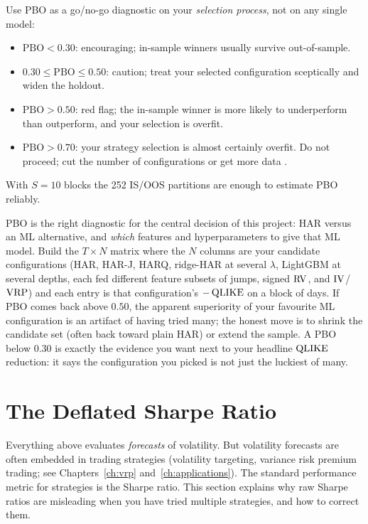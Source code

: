 \begin{keyidea}
Use PBO as a go/no-go diagnostic on your \emph{selection process}, not on any single model:
\begin{itemize}[nosep]
  \item $\text{PBO} < 0.30$: encouraging; in-sample winners usually survive out-of-sample.
  \item $0.30 \le \text{PBO} \le 0.50$: caution; treat your selected configuration sceptically and widen the holdout.
  \item $\text{PBO} > 0.50$: red flag; the in-sample winner is more likely to underperform than outperform, and your selection is overfit.
  \item $\text{PBO} > 0.70$: your strategy selection is almost certainly overfit. Do not proceed; cut the number of configurations or get more data \citep{Bailey2014PBO}.
\end{itemize}
With $S = 10$ blocks the 252 IS/OOS partitions are enough to estimate PBO reliably.
\end{keyidea}

\begin{projectconnection}
PBO is the right diagnostic for the central decision of this project: HAR versus an ML alternative, and \emph{which} features and hyperparameters to give that ML model.
Build the $T \times N$ matrix where the $N$ columns are your candidate configurations (HAR, HAR-J, HARQ, ridge-HAR at several $\lambda$, LightGBM at several depths, each fed different feature subsets of jumps, signed $\operatorname{RV}$, and $\operatorname{IV}$/$\operatorname{VRP}$) and each entry is that configuration's $-\operatorname{QLIKE}$ on a block of days.
If PBO comes back above $0.50$, the apparent superiority of your favourite ML configuration is an artifact of having tried many; the honest move is to shrink the candidate set (often back toward plain HAR) or extend the sample.
A PBO below $0.30$ is exactly the evidence you want next to your headline $\operatorname{QLIKE}$ reduction: it says the configuration you picked is not just the luckiest of many.
\end{projectconnection}

\section{The Deflated Sharpe Ratio}
\label{sec:eval-dsr}

Everything above evaluates \emph{forecasts} of volatility.
But volatility forecasts are often embedded in trading strategies (volatility targeting, variance risk premium trading; see Chapters~\ref{ch:vrp} and~\ref{ch:applications}).
The standard performance metric for strategies is the Sharpe ratio.
This section explains why raw Sharpe ratios are misleading when you have tried multiple strategies, and how to correct them.

